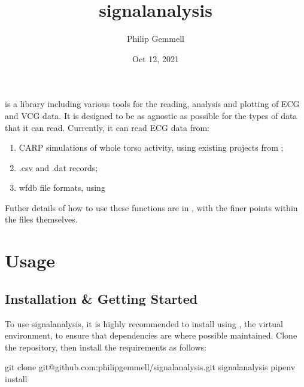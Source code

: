 \documentclass[letterpaper,10pt,english]{sphinxmanual}
\title{signalanalysis}
\date{Oct 12, 2021}
\author{Philip Gemmell}
\begin{document}
\pagestyle{empty}
\sphinxmaketitle
\pagestyle{plain}
\sphinxtableofcontents
\pagestyle{normal}
\label{\detokenize{index::doc}}


\sphinxAtStartPar
{} is a library including various tools for the reading, analysis and plotting of ECG and VCG data. It is designed to be as agnostic as possible for the types of data that it can read. Currently, it can read ECG data from:
\begin{enumerate}
%
\item {} 
\sphinxAtStartPar
CARP simulations of whole torso activity, using existing projects from ;

\item {} 
\sphinxAtStartPar
.csv and .dat records;

\item {} 
\sphinxAtStartPar
wfdb file formats, using 

\end{enumerate}

\sphinxAtStartPar
Futher details of how to use these functions are in {\hyperref[\detokenize{usage::doc}]{}}, with the finer points within the files themselves.


\chapter{Usage}
\label{\detokenize{usage:usage}}\label{\detokenize{usage::doc}}

\section{Installation \& Getting Started}
\label{\detokenize{usage:installation-getting-started}}\label{\detokenize{usage:installation}}
\sphinxAtStartPar
To use signalanalysis, it is highly recommended to install using , the virtual environment, to ensure that dependencies are where possible maintained. Clone the repository, then install the requirements as follows:

\begin{sphinxVerbatim}[commandchars=\\\{\}]
git clone git@github.com:philip\PYGZhy{}gemmell/signalanalysis.git
 signalanalysis
pipenv install
\end{sphinxVerbatim}
\end{document}
